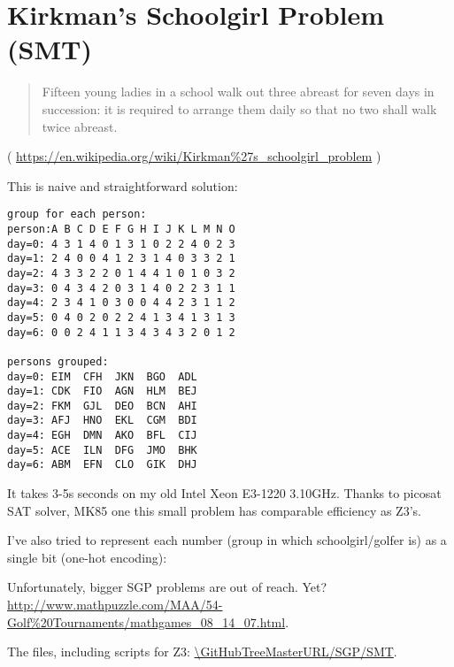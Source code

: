 \section{Kirkman's Schoolgirl Problem (SMT)}

\renewcommand{\CURPATH}{SGP/SMT}

\begin{framed}
\begin{quotation}
Fifteen young ladies in a school walk out three abreast for seven days in succession: it is required to arrange them daily so that no two shall walk twice abreast.
\end{quotation}
\end{framed}

( \url{https://en.wikipedia.org/wiki/Kirkman%27s_schoolgirl_problem} )

This is naive and straightforward solution:



\begin{lstlisting}
group for each person:
person:A B C D E F G H I J K L M N O
day=0: 4 3 1 4 0 1 3 1 0 2 2 4 0 2 3
day=1: 2 4 0 0 4 1 2 3 1 4 0 3 3 2 1
day=2: 4 3 3 2 2 0 1 4 4 1 0 1 0 3 2
day=3: 0 4 3 4 2 0 3 1 4 0 2 2 3 1 1
day=4: 2 3 4 1 0 3 0 0 4 4 2 3 1 1 2
day=5: 0 4 0 2 0 2 2 4 1 3 4 1 3 1 3
day=6: 0 0 2 4 1 1 3 4 3 4 3 2 0 1 2

persons grouped:
day=0: EIM  CFH  JKN  BGO  ADL
day=1: CDK  FIO  AGN  HLM  BEJ
day=2: FKM  GJL  DEO  BCN  AHI
day=3: AFJ  HNO  EKL  CGM  BDI
day=4: EGH  DMN  AKO  BFL  CIJ
day=5: ACE  ILN  DFG  JMO  BHK
day=6: ABM  EFN  CLO  GIK  DHJ
\end{lstlisting}

It takes 3-5s seconds on my old Intel Xeon E3-1220 3.10GHz.
Thanks to picosat SAT solver, MK85 one this small problem has comparable efficiency as Z3's.

I've also tried to represent each number (group in which schoolgirl/golfer is) as a single bit (one-hot encoding):



Unfortunately, bigger \ac{SGP} problems are out of reach. Yet?
\url{http://www.mathpuzzle.com/MAA/54-Golf%20Tournaments/mathgames_08_14_07.html}.

The files, including scripts for Z3: \url{\GitHubTreeMasterURL/\CURPATH}.


